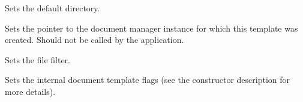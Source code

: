 Sets the default directory.



Sets the pointer to the document manager instance for which this template was created.
Should not be called by the application.



Sets the file filter.



Sets the internal document template flags (see the constructor description for more details).


